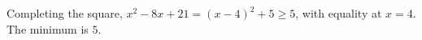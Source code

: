 Completing the square, $x^2-8x+21=(x-4)^2+5\ge5$, with equality at $x=4$. The minimum is $\boxed{5}$.
